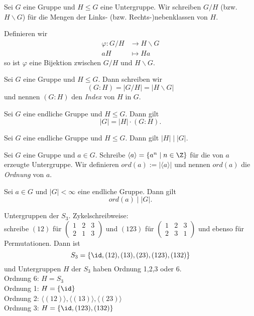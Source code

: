 \begin{defn*}
	Sei $G$ eine Gruppe und $H \leq G$ eine Untergruppe. Wir schreiben $G/H$ (bzw. $H\backslash G$) für die Mengen der Links- (bzw. Rechts-)nebenklassen von $H$.
\end{defn*}

\begin{rem*}
	Definieren wir
	\begin{align*}
		\varphi: G/H &\to H \backslash G\\
		aH &\mapsto Ha
	\end{align*}
	so ist $\varphi$ eine Bijektion zwischen $G/H$ und $ H \backslash G$.
\end{rem*}

\begin{defn*}[Index] 
	Sei $G$ eine Gruppe und $H \leq G$. Dann schreiben wir 
	\[ (G:H) = |G/H| = |H \backslash G| \]
	und nennen $(G:H)$ den \emph{Index} von $H$ in $G$.
\end{defn*}

\begin{thm}
	Sei $G$ eine endliche Gruppe und $H \leq G$. Dann gilt 
	\[ |G| = |H| \cdot (G:H). \]
\end{thm}

\begin{cor}
	Sei $G$ eine endliche Gruppe und $H \leq G$. Dann gilt $ |H| \mid |G|. $
\end{cor}

\begin{defn*}[Ordnung]
	Sei $G$ eine Gruppe und $a \in G$. Schreibe $ \langle a \rangle = \{ a^n \mid n \in \Z \} $ für die von $a$ erzeugte Untergruppe. Wir definieren $ord(a) := |\langle a \rangle|$ und nennen $ord(a)$ die \emph{Ordnung} von $a$.
\end{defn*}

\begin{cor}
	Sei $a \in G$ und $|G| < \infty$ eine endliche Gruppe. Dann gilt
	\[ ord(a) \mid |G|. \]
\end{cor}

\begin{exmp*}
	Untergruppen der $S_3$. Zykelschreibweise:\\
	schreibe $(12)$ für $ \begin{pmatrix}
		1&2&3\\2&1&3
	\end{pmatrix} $ und $(123)$ für $ \begin{pmatrix}
		1&2&3\\2&3&1
	\end{pmatrix} $ und ebenso für Permutationen. Dann ist 
	\[ S_3 = \{\id, (12),(13),(23),(123),(132)\} \]
	und Untergruppen $H$ der $S_3$ haben Ordnung 1,2,3 oder 6.\\
	Ordnung 6: $H = S_3$\\
	Ordnung 1: $ H = \{\id\} $\\
	Ordnung 2: $ \langle (12) \rangle, \langle (13) \rangle, \langle(23)\rangle $\\
	Ordnung 3: $ H = \{\id,(123),(132)\} $
\end{exmp*}